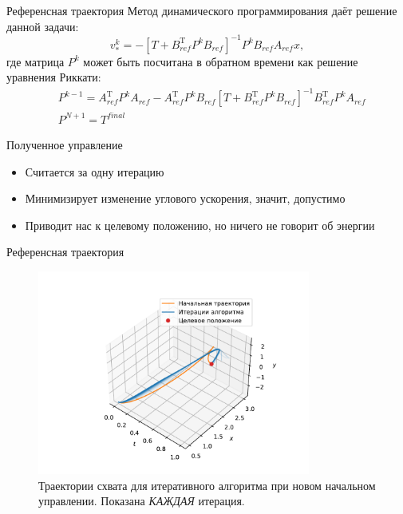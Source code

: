 \documentclass[16pt]{beamer}
\begin{document}
    \begin{frame}{Референсная траектория}
        Метод динамического программирования даёт решение данной задачи:
        $$
            v^k_* = -[T + B_{ref}^{\mathrm{T}}P^kB_{ref}]^{-1}P^kB_{ref}A_{ref} x,
        $$
        где матрица $P^k$ может быть посчитана в обратном времени как решение уравнения Риккати:
        $$
            \begin{aligned}
                &P^{k-1} = A_{ref}^{\mathrm{T}} P^{k} A_{ref} - A_{ref}^{\mathrm{T}}P^kB_{ref}[T + B_{ref}^\mathrm{T}P^kB_{ref}]^{-1}B_{ref}^{\mathrm{T}}P^{k}A_{ref}
                \\
                &P^{N+1} = T^{final}
            \end{aligned}
        $$
        \begin{block}{Полученное управление}
            \begin{itemize}
                \item Считается за одну итерацию
                \item Минимизирует изменение углового ускорения, значит, допустимо
                \item Приводит нас к целевому положению, но ничего не говорит об энергии
            \end{itemize}
        \end{block}
    \end{frame}

    \begin{frame}{Референсная траектория}
        \begin{figure}
            \includegraphics[width=0.8\textwidth]{ddp_dummy.pdf}
            \caption{Траектории схвата для итеративного алгоритма при новом начальном управлении. Показана \textit{КАЖДАЯ} итерация.}
        \end{figure}
    \end{frame}
\end{document}
